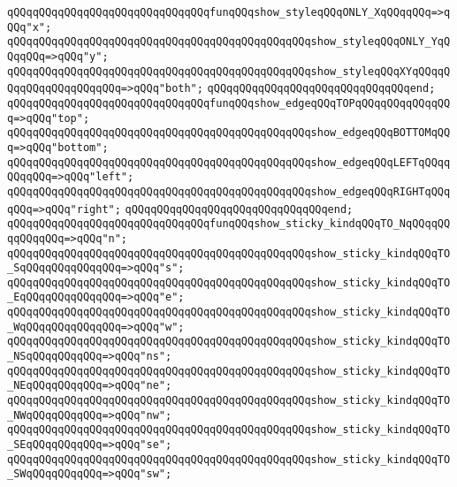 \newline
\verb|qQQqqQQqqQQqqQQqqQQqqQQqqQQqqQQqfunqQQqshow_styleqQQqONLY_XqQQqqQQq=>qQQq"x";|\newline
\verb|qQQqqQQqqQQqqQQqqQQqqQQqqQQqqQQqqQQqqQQqqQQqqQQqshow_styleqQQqONLY_YqQQqqQQq=>qQQq"y";|\newline
\verb|qQQqqQQqqQQqqQQqqQQqqQQqqQQqqQQqqQQqqQQqqQQqqQQqshow_styleqQQqXYqQQqqQQqqQQqqQQqqQQqqQQq=>qQQq"both";|\newline
\verb|qQQqqQQqqQQqqQQqqQQqqQQqqQQqqQQqend;|\newline
\newline
\verb|qQQqqQQqqQQqqQQqqQQqqQQqqQQqqQQqfunqQQqshow_edgeqQQqTOPqQQqqQQqqQQqqQQq=>qQQq"top";|\newline
\verb|qQQqqQQqqQQqqQQqqQQqqQQqqQQqqQQqqQQqqQQqqQQqqQQqshow_edgeqQQqBOTTOMqQQq=>qQQq"bottom";|\newline
\verb|qQQqqQQqqQQqqQQqqQQqqQQqqQQqqQQqqQQqqQQqqQQqqQQqshow_edgeqQQqLEFTqQQqqQQqqQQq=>qQQq"left";|\newline
\verb|qQQqqQQqqQQqqQQqqQQqqQQqqQQqqQQqqQQqqQQqqQQqqQQqshow_edgeqQQqRIGHTqQQqqQQq=>qQQq"right";|\newline
\verb|qQQqqQQqqQQqqQQqqQQqqQQqqQQqqQQqend;|\newline
\newline
\verb|qQQqqQQqqQQqqQQqqQQqqQQqqQQqqQQqfunqQQqshow_sticky_kindqQQqTO_NqQQqqQQqqQQqqQQq=>qQQq"n";|\newline
\verb|qQQqqQQqqQQqqQQqqQQqqQQqqQQqqQQqqQQqqQQqqQQqqQQqshow_sticky_kindqQQqTO_SqQQqqQQqqQQqqQQq=>qQQq"s";|\newline
\verb|qQQqqQQqqQQqqQQqqQQqqQQqqQQqqQQqqQQqqQQqqQQqqQQqshow_sticky_kindqQQqTO_EqQQqqQQqqQQqqQQq=>qQQq"e";|\newline
\verb|qQQqqQQqqQQqqQQqqQQqqQQqqQQqqQQqqQQqqQQqqQQqqQQqshow_sticky_kindqQQqTO_WqQQqqQQqqQQqqQQq=>qQQq"w";|\newline
\verb|qQQqqQQqqQQqqQQqqQQqqQQqqQQqqQQqqQQqqQQqqQQqqQQqshow_sticky_kindqQQqTO_NSqQQqqQQqqQQq=>qQQq"ns";|\newline
\verb|qQQqqQQqqQQqqQQqqQQqqQQqqQQqqQQqqQQqqQQqqQQqqQQqshow_sticky_kindqQQqTO_NEqQQqqQQqqQQq=>qQQq"ne";|\newline
\verb|qQQqqQQqqQQqqQQqqQQqqQQqqQQqqQQqqQQqqQQqqQQqqQQqshow_sticky_kindqQQqTO_NWqQQqqQQqqQQq=>qQQq"nw";|\newline
\verb|qQQqqQQqqQQqqQQqqQQqqQQqqQQqqQQqqQQqqQQqqQQqqQQqshow_sticky_kindqQQqTO_SEqQQqqQQqqQQq=>qQQq"se";|\newline
\verb|qQQqqQQqqQQqqQQqqQQqqQQqqQQqqQQqqQQqqQQqqQQqqQQqshow_sticky_kindqQQqTO_SWqQQqqQQqqQQq=>qQQq"sw";|\newline
